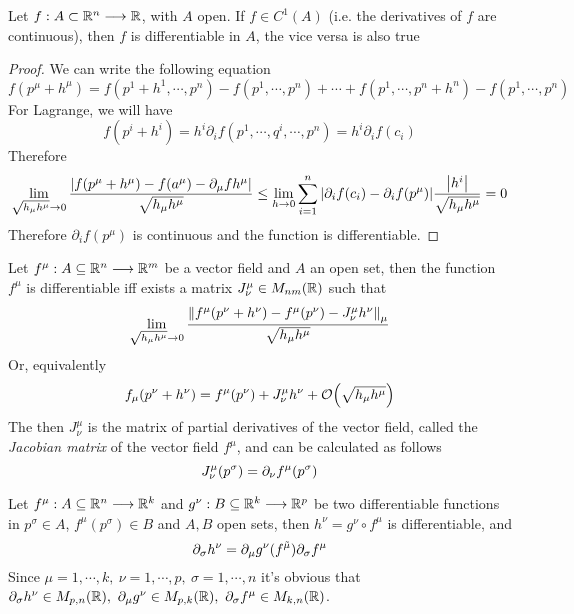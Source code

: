 \documentclass[../complete.tex]{subfiles}
\begin{document}
\begin{thm}
	Let $f:A\subset\mathbb{R}^n\overset{}{\longrightarrow}\mathbb{R}$, with $A$ open. If $f\in C^1(A)$ (i.e. the derivatives of $f$ are continuous), then $f$ is differentiable in $A$, the vice versa is also true
\end{thm}
\begin{proof}
	We can write the following equation
	\begin{equation}
		f(p^\mu+h^\mu)=f(p^1+h^1,\cdots,p^n)-f(p^1,\cdots,p^n)+\cdots+f(p^1,\cdots,p^n+h^n)-f(p^1,\cdots,p^n)
		\label{eq:prepcontdiff}
	\end{equation}
	For Lagrange, we will have
	\begin{equation}
		f(p^i+h^i)=h^i\partial_i{f}(p^1,\cdots,q^i,\cdots,p^n)=h^i\partial_if(c_i)
		\label{eq:lagrange}
	\end{equation}
	Therefore
	\begin{equation}
		\lim_{\sqrt{h_\mu h^\mu}\to0}\frac{\abs{f(p^\mu+h^\mu)-f(a^\mu)-\partial_\mu fh^\mu}}{\sqrt{h_\mu h^\mu}}\le\lim_{h\to0}\sum_{i=1}^n\abs{\partial_if(c_i)-\partial_if(p^\mu)}\frac{\abs{h^i}}{\sqrt{h_\mu h^\mu}}=0
		\label{eq:continuousdiff}
	\end{equation}
	Therefore $\partial_i f(p^\mu)$ is continuous and the function is differentiable.
\end{proof}
\begin{thm}
	Let $f^\mu:A\subseteq\mathbb{R}^n\overset{}{\longrightarrow}\mathbb{R}^m$ be a vector field and $A$ an open set, then the function $f^\mu$ is differentiable iff exists a matrix $J^\mu_\nu\in M_{nm}(\mathbb{R})$ such that
	\begin{equation}
		\lim_{\sqrt{h_\mu h^\mu}\to0}\frac{\norm{f^\mu(p^\nu+h^\nu)-f^\mu(p^\nu)-J^\mu_\nu h^\nu}_{\mu}}{\sqrt{h_\mu h^\mu}}
		\label{eq:jacmatrix}
	\end{equation}
	Or, equivalently
	\begin{equation}
		f_\mu(p^\nu+h^\nu)=f^\mu(p^\nu)+J^\mu_\nu h^\nu+\order{\sqrt{h_\mu h^\mu}}
		\label{eq:diffvf}
	\end{equation}
	The then $J^\mu_\nu$ is the matrix of partial derivatives of the vector field, called the \textit{Jacobian matrix} of the vector field $f^\mu$, and can be calculated as follows
	\begin{equation}
		J^\mu_\nu(p^\sigma)=\partial_\nu f^\mu(p^\sigma)
		\label{eq:jacobian}
	\end{equation}
\end{thm}
\begin{thm}
	Let $f^\mu:A\subseteq\mathbb{R}^n\overset{}{\longrightarrow}\mathbb{R}^k$ and $g^\nu:B\subseteq\mathbb{R}^k\overset{}{\longrightarrow}\mathbb{R}^p$ be two differentiable functions in $p^\sigma\in A$, $f^\mu(p^\sigma)\in B$ and $A,B$ open sets, then $h^\nu=g^\nu\circ f^\mu$ is differentiable, and
	\begin{equation}
		\partial_\sigma h^\nu=\partial_\mu g^\nu(f^{\tilde{\mu}})\partial_\sigma f^\mu
		\label{eq:compdervf}
	\end{equation}%
	Since $\mu=1,\cdots,k,\ \nu=1,\cdots,p,\ \sigma=1,\cdots,n$ it's obvious that $\partial_\sigma h^\nu\in M_{p,n}(\mathbb{R}),\ \partial_\mu g^\nu\in M_{p,k}(\mathbb{R}),\ \partial_\sigma f^\mu\in M_{k,n}(\mathbb{R})$.
\end{thm}
\end{document}

